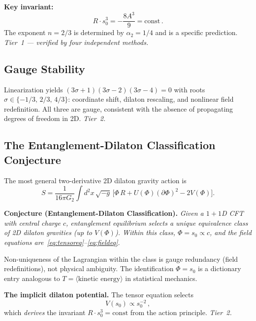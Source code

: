 \documentclass[aps,prd,twocolumn,superscriptaddress,nofootinbib,floatfix]{revtex4-2}
\newcommand{\sn}{s_0}
\begin{document}
\textbf{Key invariant:}
\begin{equation}
\label{eq:invariant}
R \cdot \sn^3 = -\frac{8A^3}{9} = \text{const}\,.
\end{equation}
The exponent $n = 2/3$ is determined by $\alpha_2 = 1/4$ and is a specific prediction. \emph{Tier~1 --- verified by four independent methods.}

\subsection{Gauge Stability}
\label{sec:stability}

Linearization yields $(3\sigma{+}1)(3\sigma{-}2)(3\sigma{-}4) = 0$ with roots $\sigma \in \{-1/3,\, 2/3,\, 4/3\}$: coordinate shift, dilaton rescaling, and nonlinear field redefinition. All three are gauge, consistent with the absence of propagating degrees of freedom in 2D. \emph{Tier~2.}

\subsection{The Entanglement-Dilaton Classification Conjecture}
\label{sec:classification}

The most general two-derivative 2D dilaton gravity action is~\cite{Grumiller2002,BanksOLoughlin1991}
\begin{equation}
S = \frac{1}{16\pi G_2}\int d^2x\,\sqrt{-g}\,\bigl[\Phi\,R + U(\Phi)(\partial\Phi)^2 - 2V(\Phi)\bigr].
\end{equation}

\textbf{Conjecture (Entanglement-Dilaton Classification).} \emph{Given a $1{+}1$D CFT with central charge $c$, entanglement equilibrium selects a unique equivalence class of 2D dilaton gravities (up to $V(\Phi)$). Within this class, $\Phi = \sn \propto c$, and the field equations are~\eqref{eq:tensoreq}--\eqref{eq:fieldeq}.}

Non-uniqueness of the Lagrangian within the class is gauge redundancy (field redefinitions), not physical ambiguity. The identification $\Phi = \sn$ is a dictionary entry analogous to $T = \langle\text{kinetic energy}\rangle$ in statistical mechanics.

\textbf{The implicit dilaton potential.} The tensor equation selects
\begin{equation}
\label{eq:potential}
V(\sn) \propto \sn^{-2}\,,
\end{equation}
which \emph{derives} the invariant $R \cdot \sn^3 = \text{const}$ from the action principle. \emph{Tier~2.}
\end{document}
